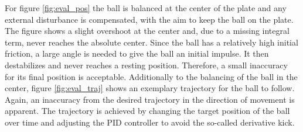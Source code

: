 For figure \ref{fig:eval_pos} the ball is balanced at the center of the plate
and any external disturbance is compensated, with the aim to keep the ball on
the plate. The figure shows a slight overshoot at the center and, due to a
missing integral term, never reaches the absolute center. Since the ball has a
relatively high initial friction, a large angle is needed to give the ball an
initial impulse. It then destabilizes and never reaches a resting position.
Therefore, a small inaccuracy for its final position is acceptable.
Additionally to the balancing of the ball in the center, figure
\ref{fig:eval_traj} shows an exemplary trajectory for the ball to follow.
Again, an inaccuracy from the desired trajectory in the direction of movement
is apparent. The trajectory is achieved by changing the target position of the
ball over time and adjusting the \ac{PID} controller to avoid the so-called
derivative kick.